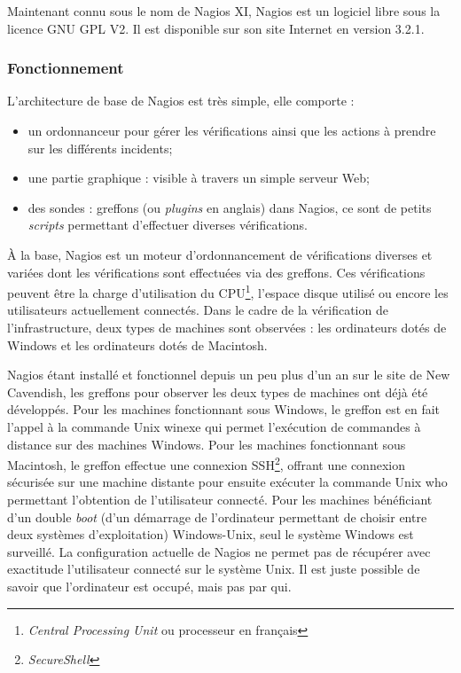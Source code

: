 Maintenant connu sous le nom de Nagios XI, Nagios est un logiciel libre sous la licence GNU GPL V2. 
Il est disponible sur son site Internet\cite{biblio:siteNagios} en version 3.2.1.

\subsubsection{Fonctionnement}

\noindent L'architecture de base de Nagios est tr\`es simple, elle comporte :

\begin{itemize}
	\item un ordonnanceur pour g\'erer les v\'erifications ainsi que les actions \`a prendre sur les diff\'erents incidents;
	\item une partie graphique : visible \`a travers un simple serveur Web;
	\item des sondes : greffons (ou \textit{plugins} en anglais) dans Nagios, ce sont de petits \textit{scripts} permettant d'effectuer diverses v\'erifications.

\end{itemize}

\vspace{0.20cm}

\`A la base, Nagios est un moteur d'ordonnancement de v\'erifications diverses et vari\'ees dont les v\'erifications sont effectu\'ees via des greffons.
Ces v\'erifications peuvent \^etre la charge d'utilisation du CPU\protect\footnote{\textit{Central Processing Unit} ou processeur en fran\c{c}ais}, l'espace disque utilis\'e ou encore les utilisateurs actuellement connect\'es.
Dans le cadre de la v\'erification de l'infrastructure, deux types de machines sont observ\'ees : les ordinateurs dot\'es de Windows et les ordinateurs dot\'es de Macintosh.

Nagios \'etant install\'e et fonctionnel depuis un peu plus d'un an sur le site de New Cavendish, les greffons pour observer les deux types de machines ont d\'ej\`a \'et\'e d\'evelopp\'es.
Pour les machines fonctionnant sous Windows, le greffon est en fait l'appel \`a la commande Unix \textsf{winexe} qui permet l'ex\'ecution de commandes \`a distance sur des machines Windows.
Pour les machines fonctionnant sous Macintosh, le greffon effectue une connexion SSH\protect\footnote{\textit{SecureShell}}, offrant une connexion s\'ecuris\'ee sur une machine distante pour ensuite ex\'ecuter la commande Unix \textsf{who} permettant l'obtention de l'utilisateur connect\'e.
Pour les machines b\'en\'eficiant d'un double \textit{boot} (d'un d\'emarrage de l'ordinateur permettant de choisir entre deux syst\`emes d'exploitation) Windows-Unix, seul le syst\`eme Windows est surveill\'e.
La configuration actuelle de Nagios ne permet pas de r\'ecup\'erer avec exactitude l'utilisateur connect\'e sur le syst\`eme Unix.
Il est juste possible de savoir que l'ordinateur est occup\'e, mais pas par qui.

